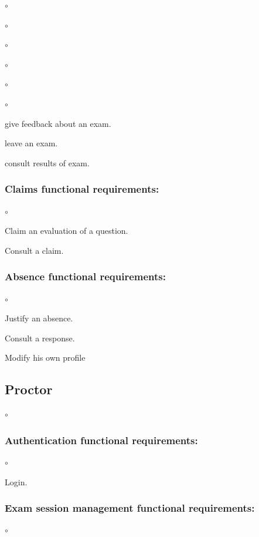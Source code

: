\documentclass[]{uc2pfecaneva}
\begin{document}
\begin{list}{$\circ$}{}
\begin{list}{$\circ$}{}
\begin{list}{$\circ$}{}
\begin{list}{$\circ$}{}
\begin{list}{$\circ$}{}
\begin{list}{$\circ$}{}
            \item give feedback about an exam.
            \item leave an exam.
            \item consult results of exam.
        \end{list}

        \subsubsection{Claims functional requirements:}
        \begin{list}{$\circ$}{}
            \item Claim an evaluation of a question.
            \item Consult a claim.
        \end{list}

        \subsubsection{Absence functional requirements:}
        \begin{list}{$\circ$}{}
            \item Justify an absence.
            \item Consult a response.
        \end{list}

        \item Modify his own profile
    \end{list}


    \subsection{Proctor}
    \begin{list}{$\circ$}{}
        \subsubsection{Authentication functional requirements:}
        \begin{list}{$\circ$}{}
            \item Login.
        \end{list}

        \subsubsection{Exam session management functional requirements:}
        \begin{list}{$\circ$}{}

\end{list}
\end{list}
\end{list}
\end{list}
\end{list}
\end{list}
\end{document}
